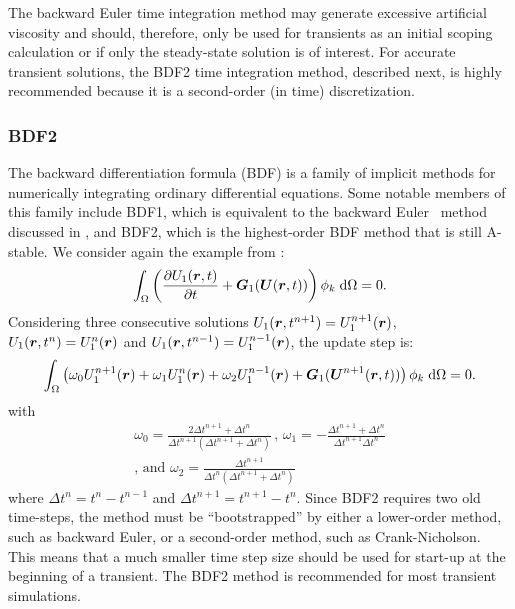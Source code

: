 The backward Euler time integration method may generate excessive artificial
viscosity and should, therefore, only be used for transients
as an initial scoping calculation or if only the steady-state solution is of
interest. For accurate transient solutions, the BDF2 time
integration method, described next, is highly recommended because it is
a second-order (in time) discretization.
\subsubsection{BDF2\label{sec:bdf2}}
The backward differentiation formula (BDF) is a family of implicit
methods for numerically integrating ordinary differential equations.
Some notable members of this family include BDF1, which is equivalent
to the backward Euler~\cite{Ascher_1998} method discussed in
, and BDF2, which is the highest-order
BDF method that is still A-stable. We consider again the example from : 
\begin{align}
  \int_{\Omega} \left(\frac{\partial U_1(\boldsymbol r,t)}{\partial t} + \boldsymbol G_1(\boldsymbol U(\boldsymbol r,t)) \right) \phi_k \; \text{d}{\Omega} = 0.
\end{align}
Considering three consecutive solutions $U_1(\boldsymbol r,t^{n+1}) = U_1^{n+1}(\boldsymbol r)$, $U_1(\boldsymbol r,t^{n}) = U_1^n(\boldsymbol r)$ and $U_1(\boldsymbol r,t^{n-1})=U_1^{n-1}(\boldsymbol r)$, the update step is:
%
\begin{align}
\label{eqn:bdf2}
  \int_{\Omega} \left(\omega_0 U_1^{n+1}(\boldsymbol r)+\omega_1 U_1^{n}(\boldsymbol r)+\omega_2 U_1^{n-1}(\boldsymbol r) + \boldsymbol G_1(\boldsymbol U^{n+1}(\boldsymbol r,t)) \right) \phi_k \; \text{d}{\Omega} = 0.
\end{align}
%
with
%
\begin{multline}
\omega_0 =\frac{2\Delta t^{n+1}+\Delta t^n}{\Delta t^{n+1} \left( \Delta t^{n+1}+\Delta t^n \right)} \,,\,
\omega_1 = -\frac{\Delta t^{n+1}+\Delta t^n}{\Delta t^{n+1} \Delta t^n}  \\
\text{, and } \omega_2 = \frac{\Delta t^{n+1}}{\Delta t^n \left( \Delta t^{n+1} + \Delta t^n \right)} \nonumber
\end{multline}
%
where $\Delta t^{n} = t^n-t^{n-1}$ and $\Delta t^{n+1} = t^{n+1}-t^{n}$.
Since BDF2 requires two old time-steps, the method must be
``bootstrapped'' by either a lower-order method, such as backward Euler, or a second-order method, such as Crank-Nicholson.  This means that a much smaller time step size should be used
for start-up at the beginning of a transient.  The BDF2 method is 
recommended for most transient simulations.
